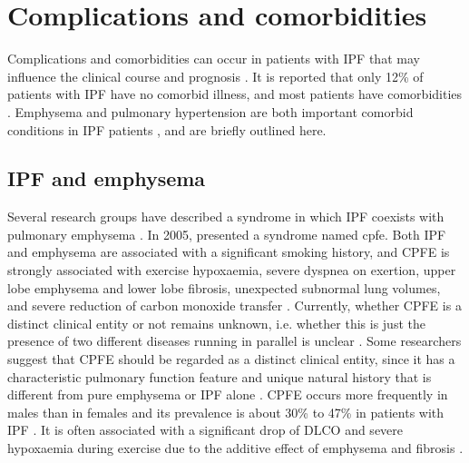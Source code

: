 \section{Complications and comorbidities}
Complications and comorbidities can occur in patients with IPF that may influence the clinical course and prognosis \citep{xaubet2017idiopathic,king2017idiopathic,martinez2017idiopathic}. It is reported that only 12\% of patients with IPF have no comorbid illness, and most patients have comorbidities \citep{raghu2011official, kim2015natural, harari2016epidemiology, kreuter2016impact}. Emphysema and pulmonary hypertension are both important comorbid conditions in IPF patients \citep{raghu2015comorbidities,martinez2017idiopathic}, and are briefly outlined here.

\subsection{IPF and emphysema}

Several research groups have described a syndrome in which IPF coexists with pulmonary emphysema \citep{wells1997lone, wells2003idiopathic, cottin2005combined,meltzer2008idiopathic}. In 2005, \cite{cottin2005combined} presented a syndrome named \gls{cpfe}. Both IPF and emphysema are associated with a significant smoking history, and CPFE is strongly associated with exercise hypoxaemia, severe dyspnea on exertion, upper lobe emphysema and lower lobe fibrosis, unexpected subnormal lung volumes, and severe reduction of carbon monoxide transfer \citep{silva2008idiopathic,mejia2009idiopathic,cottin2010pulmonary,king2011idiopathic,lin2015combined}. Currently, whether CPFE is a distinct clinical entity or not remains unknown, i.e. whether this is just the presence of two different diseases running in parallel is unclear \citep{king2011idiopathic,lin2015combined}. Some researchers suggest that CPFE should be regarded as a distinct clinical entity, since it has a characteristic pulmonary function feature and unique natural history that is different from pure emphysema or IPF alone \citep{cottin2005combined, lin2015combined, xaubet2017idiopathic}. CPFE occurs more frequently in males than in females and its prevalence is about 30\% to 47\% in patients with IPF \citep{xaubet2017idiopathic}. It is often associated with a significant drop of DLCO and severe hypoxaemia during exercise due to the additive effect of emphysema and fibrosis \citep{xaubet2017idiopathic}. 
\newpage

